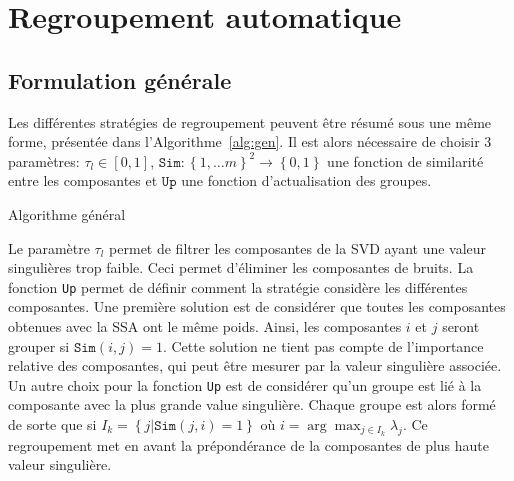 \documentclass{gretsi}
\makeatletter
\def\BState{\State\hskip-\ALG@thistlm}
\makeatother
\begin{document}
\section{Regroupement automatique}

\subsection{Formulation générale}
\label{sub:form}

Les différentes stratégies de regroupement peuvent être résumé sous une même forme, présentée dans \mbox{l'Algorithme \ref{alg:gen}}. Il est alors nécessaire de choisir 3 paramètres: $\tau_l \in \left[0, 1\right]$, $\texttt{Sim}: \left \{ 1, \dots m \right \}^2 \to \left \{ 0,1 \right \}$ une fonction de similarité entre les composantes et $\texttt{Up}$ une fonction d'actualisation des groupes.\\

\begin{algorithm}
\caption{Algorithme général}\label{alg:gen}
\end{algorithm}

Le paramètre $\tau_l$ permet de filtrer les composantes de la SVD ayant une valeur singulières trop faible. Ceci permet d'éliminer les composantes de bruits. La fonction \texttt{Up} permet de définir comment la stratégie considère les différentes composantes. Une première solution est de considérer que toutes les composantes obtenues avec la SSA ont le même poids. Ainsi, les composantes $i$ et $j$ seront grouper si $\texttt{Sim}(i, j) = 1$. Cette solution ne tient pas compte de l'importance relative des composantes, qui peut être mesurer par la valeur singulière associée. Un autre choix pour la fonction \texttt{Up} est de considérer qu'un groupe est lié à la composante avec la plus grande value singulière. Chaque groupe est alors formé de sorte que si $I_k = \left\{j | \texttt{Sim}(j, i) = 1\right\}$ où $i = \arg\max_{j\in I_k} \lambda_j$. Ce regroupement met en avant la prépondérance de la composantes de plus haute valeur singulière.\\
\end{document}
